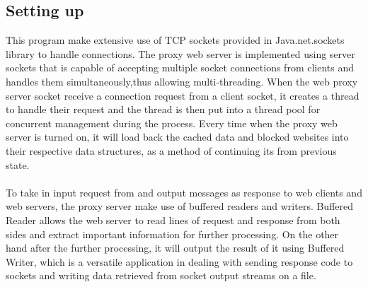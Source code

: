 \documentclass[12pt]{article}%
\begin{document}
\subsection*{Setting up}
This program make extensive use of TCP sockets provided in Java.net.sockets library to handle connections. The proxy web server is implemented using server sockets that is capable of accepting multiple socket connections from clients and handles them simultaneously,thus allowing multi-threading. When the web proxy server socket receive a connection request from a client socket, it creates a thread to handle their request and the thread is then put into a thread pool for concurrent management during the process. Every time when the proxy web server is turned on, it will load back the cached data and blocked websites into their respective data structures, as a method of continuing its from previous state. \\ \\
To take in input request from and output messages as response to web clients and web servers, the proxy server make use of buffered readers and writers. Buffered Reader allows the web server to read lines of request and response from both sides and extract important information for further processing. On the other hand after the further processing, it will output the result of it using Buffered Writer, which is a versatile application in dealing with sending response code to sockets and writing data retrieved from socket output streams on a file. \\
\end{document}
